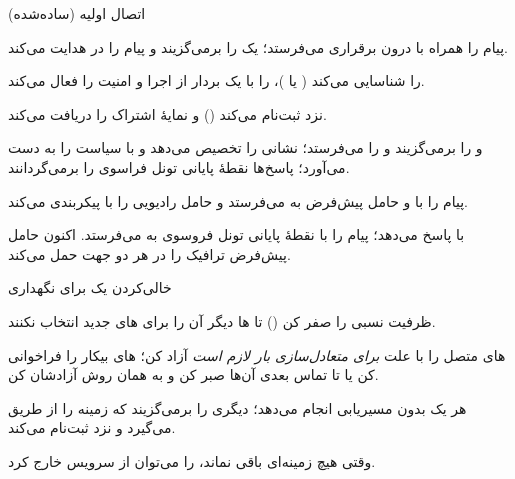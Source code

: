 \documentclass[11pt,a4paper]{article}
\begin{document}
\begin{procedurebox}{اتصال اولیه (ساده‌شده)}\label{proc:attach}
\begin{steps}
  \item {} پیام  را همراه با  درون برقراری  می‌فرستد؛
         یک  را برمی‌گزیند و پیام را در  هدایت می‌کند.
  \item {}  را شناسایی می‌کند ( یا )،  را با یک بردار از  اجرا
        و امنیت  را فعال می‌کند.
  \item {} نزد  ثبت‌نام می‌کند () و نمایهٔ اشتراک را دریافت می‌کند.
  \item {}  و  را برمی‌گزیند و  را می‌فرستد؛  نشانی
         را تخصیص می‌دهد و با  سیاست را به دست می‌آورد؛ پاسخ‌ها نقطهٔ پایانی تونل فراسوی 
        را برمی‌گردانند.
  \item {} پیام  را با  و حامل پیش‌فرض به  می‌فرستد و
         حامل رادیویی را با  پیکربندی می‌کند.
  \item {} با  پاسخ می‌دهد؛  پیام  را با نقطهٔ پایانی تونل
        فروسوی  به  می‌فرستد. اکنون حامل پیش‌فرض ترافیک را در هر دو جهت حمل می‌کند.
\end{steps}
\end{procedurebox}

\begin{acnfigure}
  \caption{اتصال اولیهٔ ساده‌شدهٔ  (\cref{proc:attach}) \cite{ts23401}.}
  \label{fig:attach}
\end{acnfigure}

\begin{procedurebox}{خالی‌کردن یک  برای نگهداری}\label{proc:rebalance}
\begin{steps}
  \item ظرفیت نسبی  را صفر کن () تا ها دیگر آن را برای های
        جدید انتخاب نکنند.
  \item {}های متصل را با علت \emph{ برای متعادل‌سازی بار لازم است} آزاد کن؛ های بیکار را فراخوانی
        کن یا تا تماس بعدی آن‌ها صبر کن و به همان روش آزادشان کن.
  \item هر  یک  بدون مسیریابی  انجام می‌دهد؛   دیگری را برمی‌گزیند که زمینه
        را از طریق  می‌گیرد و نزد  ثبت‌نام می‌کند.
  \item وقتی هیچ زمینه‌ای باقی نماند،  را می‌توان از سرویس خارج کرد.
\end{steps}
\end{procedurebox}
\end{document}
